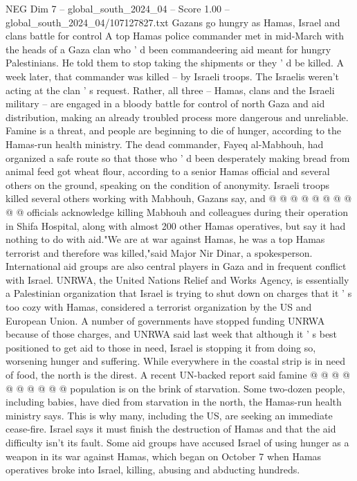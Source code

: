 \begin{textsample}{NEG Dim 7 – global\_south\_2024\_04 – Score 1.00 – global\_south\_2024\_04/107127827.txt}  \label{ex:f7_neg_285}
Gazans go hungry as Hamas, Israel and clans battle for control A top Hamas police commander met in mid-March with the heads of a Gaza clan who ' d been commandeering aid meant for hungry Palestinians.
He told them to stop taking the shipments or they ' d be killed.
A week later, that commander was killed -- by Israeli troops.
The Israelis weren't acting at the clan ' s request.
Rather, all three -- Hamas, clans and the Israeli military -- are engaged in a bloody battle for control of north Gaza and aid distribution, making an already troubled process more dangerous and unreliable.
Famine is a threat, and people are beginning to die of hunger, according to the Hamas-run health ministry.
The dead commander, Fayeq al-Mabhouh, had organized a safe route so that those who ' d been desperately making bread from animal feed got wheat flour, according to a senior Hamas official and several others on the ground, speaking on the condition of anonymity.
Israeli troops killed several others working with Mabhouh, Gazans say, and @ @ @ @ @ @ @ @ @ @ officials acknowledge killing Mabhouh and colleagues during their operation in Shifa Hospital, along with almost 200 other Hamas operatives, but say it had nothing to do with aid."We are at war against Hamas, he was a top Hamas terrorist and therefore was killed,"said Major Nir Dinar, a spokesperson.
International aid groups are also central players in Gaza and in frequent conflict with Israel.
UNRWA, the United Nations Relief and Works Agency, is essentially a Palestinian organization that Israel is trying to shut down on charges that it ' s too cozy with Hamas, considered a terrorist organization by the US and European Union.
A number of governments have stopped funding UNRWA because of those charges, and UNRWA said last week that although it ' s best positioned to get aid to those in need, Israel is stopping it from doing so, worsening hunger and suffering.
While everywhere in the coastal strip is in need of food, the north is the direst.
A recent UN-backed report said famine @ @ @ @ @ @ @ @ @ @ population is on the brink of starvation.
Some two-dozen people, including babies, have died from starvation in the north, the Hamas-run health ministry says.
This is why many, including the US, are seeking an immediate cease-fire.
Israel says it must finish the destruction of Hamas and that the aid difficulty isn't its fault.
Some aid groups have accused Israel of using hunger as a weapon in its war against Hamas, which began on October 7 when Hamas operatives broke into Israel, killing, abusing and abducting hundreds.

\end{textsample}
